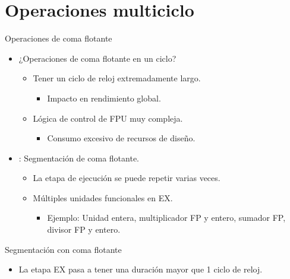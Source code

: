 \section{Operaciones multiciclo}

\begin{frame}[t]{Operaciones de coma flotante}
\begin{itemize}
  \item ¿Operaciones de coma flotante en un ciclo?
    \begin{itemize}
      \item Tener un ciclo de reloj extremadamente largo.
        \begin{itemize}
          \item Impacto en rendimiento global.
        \end{itemize}
      \item Lógica de control de FPU muy compleja.
        \begin{itemize}
          \item Consumo excesivo de recursos de diseño.
        \end{itemize}
    \end{itemize}

  \item {}: Segmentación de coma flotante.
    \begin{itemize}
      \item La etapa de ejecución se puede repetir varias veces.
      \item Múltiples unidades funcionales en EX.
        \begin{itemize}
          \item Ejemplo: Unidad entera, multiplicador FP y entero, sumador FP, divisor FP y entero.
        \end{itemize}
    \end{itemize}
\end{itemize}
\end{frame}

\begin{frame}[t]{Segmentación con coma flotante}
\begin{itemize}
  \item La etapa EX pasa a tener una duración mayor que 1 ciclo de reloj.
\end{itemize}
\makebox[\textwidth][c]{

}

\end{frame}

